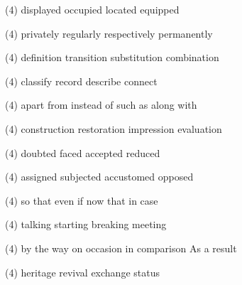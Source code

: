\item
\begin{tasks}(4)
	\task displayed
	\task occupied
	\task located
	\task equipped
\end{tasks}
\item
\begin{tasks}(4)
	\task privately
	\task regularly
	\task respectively
	\task permanently
\end{tasks}
\item
\begin{tasks}(4)
	\task definition
	\task transition
	\task substitution
	\task combination
\end{tasks}
\item
\begin{tasks}(4)
	\task classify
	\task record
	\task describe
	\task connect
\end{tasks}
\item
\begin{tasks}(4)
	\task apart from
	\task instead of
	\task such as
	\task along with
\end{tasks}
\item
\begin{tasks}(4)
	\task construction
	\task restoration
	\task impression
	\task evaluation
\end{tasks}
\item
\begin{tasks}(4)
	\task doubted
	\task faced
	\task accepted
	\task reduced
\end{tasks}
\item
\begin{tasks}(4)
	\task assigned
	\task subjected
	\task accustomed
	\task opposed
\end{tasks}
\item
\begin{tasks}(4)
	\task so that
	\task even if
	\task now that
	\task in case
\end{tasks}
\item
\begin{tasks}(4)
	\task talking
	\task starting
	\task breaking
	\task meeting
\end{tasks}
\item
\begin{tasks}(4)
	\task by the way
	\task on occasion
	\task in comparison
	\task As a result
\end{tasks}
\item
\begin{tasks}(4)
	\task heritage
	\task revival
	\task exchange
	\task status
\end{tasks}
